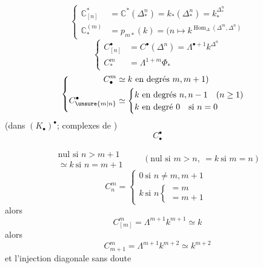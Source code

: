 \[
\left\{\begin{aligned}
\mathbb C_{[n]}^*&=\mathbb C^*(\Delta_*^n)=k_*(\Delta_*^n)=k_*^{\Delta_*^n}\\
\mathbb C_*^{(m)}&=p_{m*}(k)=(n\longmapsto k^{\operatorname{Hom}_\Delta(\Delta^m,\Delta^n)}
\end{aligned}\right.
\]
\[
\left\{\begin{aligned}
C_{[n]}^\bullet&=C^\bullet(\Delta^n)=\Lambda^{\bullet+1}k^{\Delta^n}\\
C_*^m&=\Lambda^{1+m}\Phi_*
\end{aligned}\right.
\]
\[
\left\{\begin{aligned}
C_\bullet^m&\simeq k\ \text{en degrés }m,m+1)\\
C_{\unsure{m|n}}^\bullet&\simeq
\begin{cases}k\ \text{en degrés }n,n-1\quad(n\geq1)\\
k\ \text{en degré }0\quad\text{si }n=0
\end{cases}
\end{aligned}\right.
\]
(dans $(K_\bullet)^\bullet$; complexes de )
\[
C_\bullet^\bullet
\]

\[
\begin{gathered}
\text{nul si }n>m+1\\
\simeq k\ \text{si }n=m+1
\end{gathered}
\qquad
(\text{nul si }m>n,\ =k\ \text{si }m=n)
\]
\[
C_n^m=
\begin{cases}
0\ \text{si }n\ne m,m+1\\
k\ \text{si }n\begin{cases}=m\\=m+1\end{cases}
\end{cases}
\]
alors
\[
C_{[m]}^m=\Lambda^{m+1}k^{m+1}\simeq k
\]
alors
\[
C_{m+1}^m=\Lambda^{m+1}k^{m+2}\simeq k^{m+2}
\]
et  l'injection diagonale sans doute


